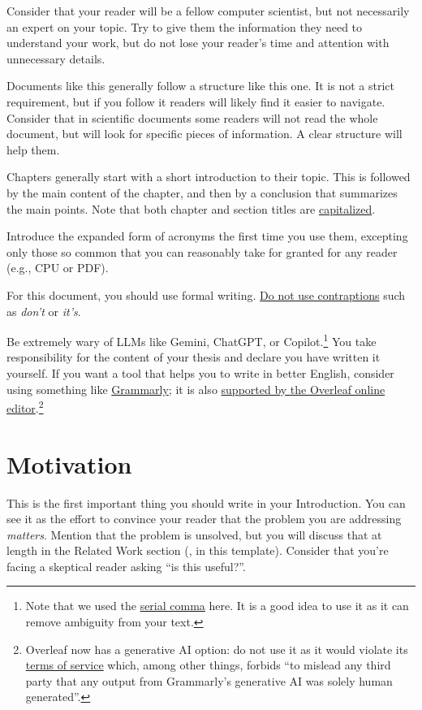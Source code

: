 Consider that your reader will be a fellow computer scientist, but not necessarily an expert
on your topic. Try to give them the information they need to understand your work, but
do not lose your reader's time and attention with unnecessary details.

Documents like this generally follow a structure like this one. It is not a strict
requirement, but if you follow it readers will likely find it easier to navigate.
Consider that in scientific documents some readers will not read the whole document,
but will look for specific pieces of information. A clear structure will help them.

Chapters generally start with a short introduction to their topic. This is followed by the main content of the chapter, and then by a conclusion
that summarizes the main points. Note that both chapter and section titles are
\href{https://www.grammarly.com/blog/capitalization-in-the-titles/}{capitalized}.

Introduce the expanded form of acronyms the first time you use them, excepting only those so common that you can reasonably take for granted for any reader (e.g., CPU or PDF).

For this document, you should use formal writing. \href{https://www.grammarly.com/blog/contractions/}{Do not use contraptions} such as \emph{don't} or \emph{it's}.

Be extremely wary of \acp{LLM} like Gemini, ChatGPT, or
Copilot.\footnote{Note that we used the \href{https://en.wikipedia.org/wiki/Serial_comma}{serial comma} here. It is a good idea to use it as it can remove ambiguity from your text.} You take
responsibility for the content of your thesis and declare you have written it yourself.
If you want a tool that helps you to write in better English, consider using something like
\href{https://grammarly.com}{Grammarly}; it is also \href{https://www.overleaf.com/learn/how-to/Use_Grammarly_with_Overleaf}{supported by the Overleaf online \latex editor}.\footnote{Overleaf now has a generative AI option: do not use it as it would violate its \href{https://www.grammarly.com/terms}{terms of service} which, among other things, forbids ``to mislead any third party that any output from Grammarly’s generative AI was solely human generated''.}

\section{Motivation}

This is the first important thing you should write in your Introduction.
You can see it as the effort to convince your reader that the problem you are addressing
\emph{matters}. Mention that the problem is unsolved, but you will discuss that at
length in the Related Work section (, in this template). Consider that
you're facing a skeptical reader asking ``is this useful?''.

